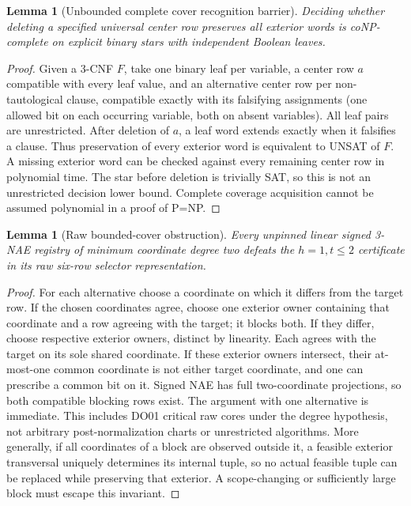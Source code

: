 \documentclass[11pt]{article}
\newtheorem{lemma}[theorem]{Lemma}
\begin{document}
\begin{lemma}[Unbounded complete cover recognition barrier]\label{lem:bs18-star}
Deciding whether deleting a specified universal center row preserves all exterior words is coNP-complete on explicit binary stars with independent Boolean leaves.
\end{lemma}
\begin{proof}
Given a 3-CNF $F$, take one binary leaf per variable, a center row $a$ compatible with every leaf value, and an alternative center row per non-tautological clause, compatible exactly with its falsifying assignments (one allowed bit on each occurring variable, both on absent variables). All leaf pairs are unrestricted. After deletion of $a$, a leaf word extends exactly when it falsifies a clause. Thus preservation of every exterior word is equivalent to UNSAT of $F$. A missing exterior word can be checked against every remaining center row in polynomial time. The star before deletion is trivially SAT, so this is not an unrestricted decision lower bound. Complete coverage acquisition cannot be assumed polynomial in a proof of P=NP.
\end{proof}
\begin{lemma}[Raw bounded-cover obstruction]\label{lem:bs18-stall}
Every unpinned linear signed 3-NAE registry of minimum coordinate degree two defeats the $h=1,t\le2$ certificate in its raw six-row selector representation.
\end{lemma}
\begin{proof}
For each alternative choose a coordinate on which it differs from the target row. If the chosen coordinates agree, choose one exterior owner containing that coordinate and a row agreeing with the target; it blocks both. If they differ, choose respective exterior owners, distinct by linearity. Each agrees with the target on its sole shared coordinate. If these exterior owners intersect, their at-most-one common coordinate is not either target coordinate, and one can prescribe a common bit on it. Signed NAE has full two-coordinate projections, so both compatible blocking rows exist. The argument with one alternative is immediate. This includes DO01 critical raw cores under the degree hypothesis, not arbitrary post-normalization charts or unrestricted algorithms. More generally, if all coordinates of a block are observed outside it, a feasible exterior transversal uniquely determines its internal tuple, so no actual feasible tuple can be replaced while preserving that exterior. A scope-changing or sufficiently large block must escape this invariant.
\end{proof}
\end{document}
